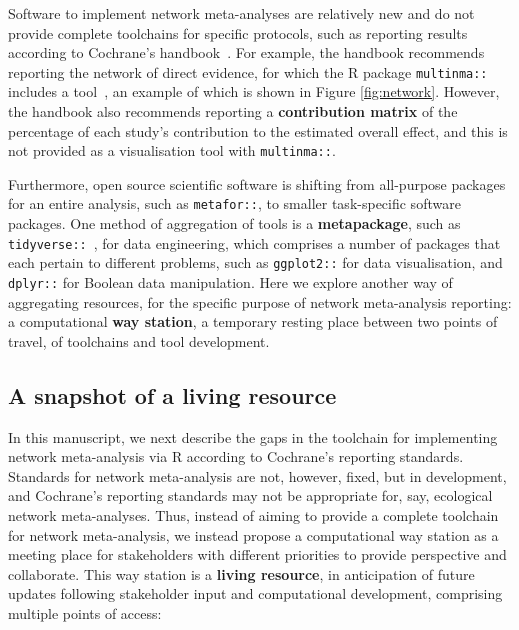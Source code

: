 \documentclass[12pt]{article}\usepackage[]{graphicx}\usepackage[]{color}
\newcommand{\package}[1]{\texttt{{#1::}}}
\begin{document}
Software to implement network meta-analyses are relatively new and do not provide complete toolchains for specific protocols, such as reporting results according to Cochrane's handbook~\cite{higgins2019cochrane}. For example, the handbook recommends reporting the network of direct evidence, for which the R package \package{multinma} includes a tool~\cite{phillippo_multinma_2020}, an example of which is shown in Figure \ref{fig:network}. However, the handbook also recommends reporting a \textbf{contribution matrix} of the percentage of each study's contribution to the estimated overall effect, and this is not provided as a visualisation tool with \package{multinma}.

Furthermore, open source scientific software is shifting from all-purpose packages for an entire analysis, such as \package{metafor}, to smaller task-specific software packages. One method of aggregation of tools is a \textbf{metapackage}, such as \package{tidyverse}~\cite{wickham_tidyverse_2017}, for data engineering, which comprises a number of packages that each pertain to different problems, such as \package{ggplot2} for data visualisation, and \package{dplyr} for Boolean data manipulation. Here we explore another way of aggregating resources, for the specific purpose of network meta-analysis reporting: a computational \textbf{way station}, a temporary resting place between two points of travel, of toolchains and tool development.

\subsection{A snapshot of a living resource}

In this manuscript, we next describe the gaps in the toolchain for implementing network meta-analysis via R according to Cochrane's reporting standards. Standards for network meta-analysis are not, however, fixed, but in development, and Cochrane's reporting standards may not be appropriate for, say, ecological network meta-analyses. Thus, instead of aiming to provide a complete toolchain for network meta-analysis, we instead propose a computational way station as a meeting place for stakeholders with different priorities to provide perspective and collaborate. This way station is a \textbf{living resource}, in anticipation of future updates following stakeholder input and computational development, comprising multiple points of access:
\end{document}
